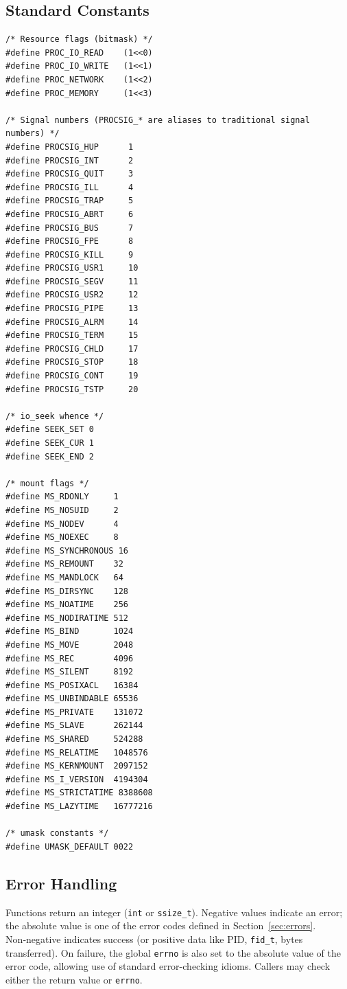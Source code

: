 \documentclass[12pt,a4paper]{article}
\begin{document}
\subsection{Standard Constants}
\begin{lstlisting}
/* Resource flags (bitmask) */
#define PROC_IO_READ    (1<<0)
#define PROC_IO_WRITE   (1<<1)
#define PROC_NETWORK    (1<<2)
#define PROC_MEMORY     (1<<3)

/* Signal numbers (PROCSIG_* are aliases to traditional signal numbers) */
#define PROCSIG_HUP      1
#define PROCSIG_INT      2
#define PROCSIG_QUIT     3
#define PROCSIG_ILL      4
#define PROCSIG_TRAP     5
#define PROCSIG_ABRT     6
#define PROCSIG_BUS      7
#define PROCSIG_FPE      8
#define PROCSIG_KILL     9
#define PROCSIG_USR1     10
#define PROCSIG_SEGV     11
#define PROCSIG_USR2     12
#define PROCSIG_PIPE     13
#define PROCSIG_ALRM     14
#define PROCSIG_TERM     15
#define PROCSIG_CHLD     17
#define PROCSIG_STOP     18
#define PROCSIG_CONT     19
#define PROCSIG_TSTP     20

/* io_seek whence */
#define SEEK_SET 0
#define SEEK_CUR 1
#define SEEK_END 2

/* mount flags */
#define MS_RDONLY     1
#define MS_NOSUID     2
#define MS_NODEV      4
#define MS_NOEXEC     8
#define MS_SYNCHRONOUS 16
#define MS_REMOUNT    32
#define MS_MANDLOCK   64
#define MS_DIRSYNC    128
#define MS_NOATIME    256
#define MS_NODIRATIME 512
#define MS_BIND       1024
#define MS_MOVE       2048
#define MS_REC        4096
#define MS_SILENT     8192
#define MS_POSIXACL   16384
#define MS_UNBINDABLE 65536
#define MS_PRIVATE    131072
#define MS_SLAVE      262144
#define MS_SHARED     524288
#define MS_RELATIME   1048576
#define MS_KERNMOUNT  2097152
#define MS_I_VERSION  4194304
#define MS_STRICTATIME 8388608
#define MS_LAZYTIME   16777216

/* umask constants */
#define UMASK_DEFAULT 0022
\end{lstlisting}

\subsection{Error Handling}
Functions return an integer (\texttt{int} or \texttt{ssize\_t}). Negative values indicate an error; the absolute value is one of the error codes defined in Section~\ref{sec:errors}. Non‑negative indicates success (or positive data like PID, \texttt{fid\_t}, bytes transferred). On failure, the global \texttt{errno} is also set to the absolute value of the error code, allowing use of standard error-checking idioms. Callers may check either the return value or \texttt{errno}.
\end{document}
